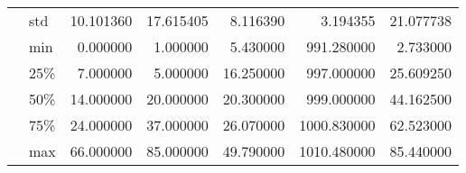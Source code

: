 \begin{tabular}{llrrrrr}
  & std &     10.101360 &     17.615405 &      8.116390 &      3.194355 &     21.077738 \\
  & min &      0.000000 &      1.000000 &      5.430000 &    991.280000 &      2.733000 \\
  & 25\% &      7.000000 &      5.000000 &     16.250000 &    997.000000 &     25.609250 \\
  & 50\% &     14.000000 &     20.000000 &     20.300000 &    999.000000 &     44.162500 \\
  & 75\% &     24.000000 &     37.000000 &     26.070000 &   1000.830000 &     62.523000 \\
  & max &     66.000000 &     85.000000 &     49.790000 &   1010.480000 &     85.440000 \\
\bottomrule
\end{tabular}
